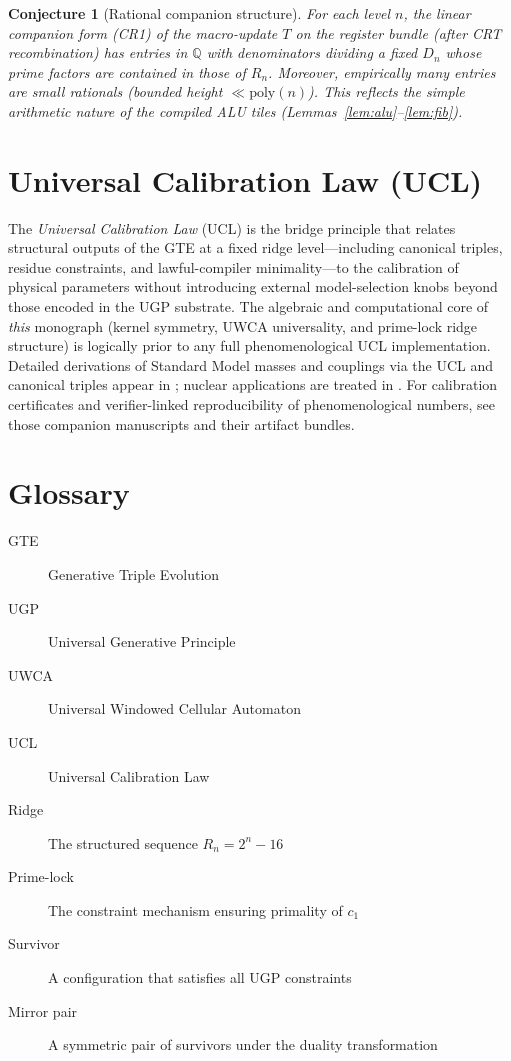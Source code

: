 \documentclass[12pt]{article}
\newtheorem{conjecture}[theorem]{Conjecture}
\numberwithin{equation}{section}
\begin{document}
\begin{conjecture}[Rational companion structure]\label{conj:cr1-rational}
For each level $n$, the linear companion form (CR1) of the macro-update $T$ on the register bundle (after CRT recombination) has entries in $\mathbb{Q}$ with denominators dividing a fixed $D_n$ whose prime factors are contained in those of $R_n$. Moreover, empirically many entries are small rationals (bounded height $\ll \mathrm{poly}(n)$). This reflects the simple arithmetic nature of the compiled ALU tiles (Lemmas~\ref{lem:alu}--\ref{lem:fib}).
\end{conjecture}

\section{Universal Calibration Law (UCL)}\label{app:ucl}
The \emph{Universal Calibration Law} (UCL) is the bridge principle that relates structural outputs of the GTE at a fixed ridge level---including canonical triples, residue constraints, and lawful-compiler minimality---to the calibration of physical parameters without introducing external model-selection knobs beyond those encoded in the UGP substrate. The algebraic and computational core of \emph{this} monograph (kernel symmetry, UWCA universality, and prime-lock ridge structure) is logically prior to any full phenomenological UCL implementation. Detailed derivations of Standard Model masses and couplings via the UCL and canonical triples appear in \cite{Spivack2025_ParticlePhysics}; nuclear applications are treated in \cite{Spivack2025_Nucleus}. For calibration certificates and verifier-linked reproducibility of phenomenological numbers, see those companion manuscripts and their artifact bundles.

\section{Glossary}\label{app:glossary}
\begin{description}
\item[GTE] Generative Triple Evolution
\item[UGP] Universal Generative Principle
\item[UWCA] Universal Windowed Cellular Automaton
\item[UCL] Universal Calibration Law
\item[Ridge] The structured sequence $R_n = 2^n - 16$
\item[Prime-lock] The constraint mechanism ensuring primality of $c_1$
\item[Survivor] A configuration that satisfies all UGP constraints
\item[Mirror pair] A symmetric pair of survivors under the duality transformation
\end{description}
\end{document}
